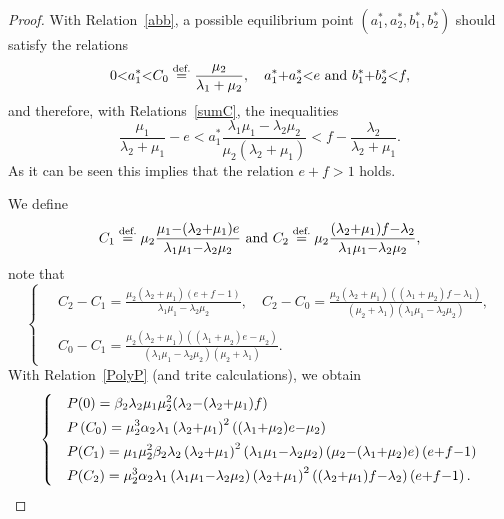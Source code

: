 \documentclass[english]{amsart}
\newcommand\steq[1]{\stackrel{\text{\rm #1.}}{=}}
\numberwithin{proposition}{section}
\begin{document}
\begin{proof}
With Relation~\eqref{abb}, a possible equilibrium point $(a_1^*,a_2^*,b_1^*,b_2^*)$ should satisfy the relations
\begin{equation}\label{feq1}
0{<} a_1^*{<} C_0\steq{def}\frac{\mu_2}{\lambda_1  + \mu_2}, \quad a_1^*{+}a_2^*{<}e \text{ and } b_1^*{+}b_2^*{<}f,
\end{equation}
and therefore, with Relations~\eqref{sumC}, the inequalities
\begin{equation}\label{feq12}
\frac{\mu_1}{\lambda_2  + \mu_1}{-}e < a_1^*\frac{\lambda_1\mu_1{-}\lambda_2\mu_2}{\mu_2(\lambda_2  + \mu_1)}
< f{-} \frac{\lambda_2}{\lambda_2  +\mu_1}.
\end{equation}
As it can be seen this implies that the relation $e{+}f{>}1$ holds. 

We define
\[
C_1\steq{def}\mu_2\frac{\mu_1{-}(\lambda_2{+}\mu_1)e}{\lambda_1\mu_1{-}\lambda_2\mu_2} \text{ and } C_2\steq{def}\mu_2\frac{(\lambda_2{+}\mu_1)f{-} \lambda_2}{\lambda_1\mu_1{-}\lambda_2\mu_2},
\]
note that
\begin{equation}\label{Ineq}
\begin{cases}
&C_2{-}C_1{=}\displaystyle\frac{\mu_2(\lambda_2{+}\mu_1)(e{+}f{-}1)}{\lambda_1\mu_1{-}\lambda_2\mu_2}, \quad C_2{-}C_0{=}\frac{\mu_2  \left(\lambda_2  +\mu_1  \right) \left((\lambda_1{+}\mu_2)f{-} \lambda_1 \right)}{\left(\mu_2  +\lambda_1  \right) \left(\lambda_1  \mu_1{-}\lambda_2  \mu_2  \right)},\\
\ \\
 &C_0{-}C_1{=}\displaystyle\frac{\mu_2(\lambda_2{+}\mu_1)((\lambda_1{+}\mu_2)e{-}\mu_2)}{(\lambda_1\mu_1{-}\lambda_2\mu_2)(\mu_2{+}\lambda_1)}.
\end{cases}
\end{equation}
With Relation~\eqref{PolyP} (and trite calculations), we obtain
\begin{equation}\label{RelP}
\begin{cases}
&P(0)\displaystyle=\beta_2  \lambda_2  \mu_1 \mu_2^{2} (\lambda_2{-}(\lambda_2{+}\mu_1)f )\smallskip\\
&P\left(C_0\right)\displaystyle=\mu_2^{3} \alpha_2  \lambda_1  \left(\lambda_2 {+}\mu_1  \right)^{2} \left((\lambda_1{+}\mu_2)e  {-}\mu_2  \right)\smallskip\\
&P(C_1)\displaystyle=\mu_1 \mu_2^{2} \beta_2  \lambda_2  \left(\lambda_2{+}\mu_1  \right)^{2} \left(\lambda_1  \mu_1  {-}\lambda_2  \mu_2  \right) \left(\mu_2{-}(\lambda_1{+} \mu_2)e\right) \left(e{+}f{-}1\right)\smallskip\\
&P(C_2)\displaystyle=\mu_2^{3} \alpha_2  \lambda_1\left(\lambda_1  \mu_1  {-}\lambda_2  \mu_2\right)  \left(\lambda_2 {+}\mu_1  \right)^{2} \left((\lambda_2{+}\mu_1)f  {-}\lambda_2  \right) \left(e{+}f{-}1\right).
\end{cases}
\end{equation}


\end{proof}
\end{document}
